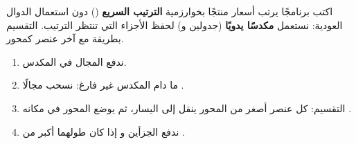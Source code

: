 \begin{statement}
اكتب برنامجًا يرتب أسعار  منتجًا بخوارزمية \textbf{الترتيب السريع} () دون استعمال الدوال العودية: نستعمل \textbf{مكدسًا يدويًا} (جدولين  و) لحفظ الأجزاء التي تنتظر الترتيب. التقسيم بطريقة  مع آخر عنصر كمحور.
\end{statement}
\begin{stepsbox}\begin{enumerate}
\item ندفع المجال \code{[0, NB-1]} في المكدس.
\item ما دام المكدس غير فارغ: نسحب مجالًا .
\item التقسيم: كل عنصر أصغر من المحور ينقل إلى اليسار، ثم يوضع المحور في مكانه .
\item ندفع الجزأين  و إذا كان طولهما أكبر من .
\end{enumerate}\end{stepsbox}

